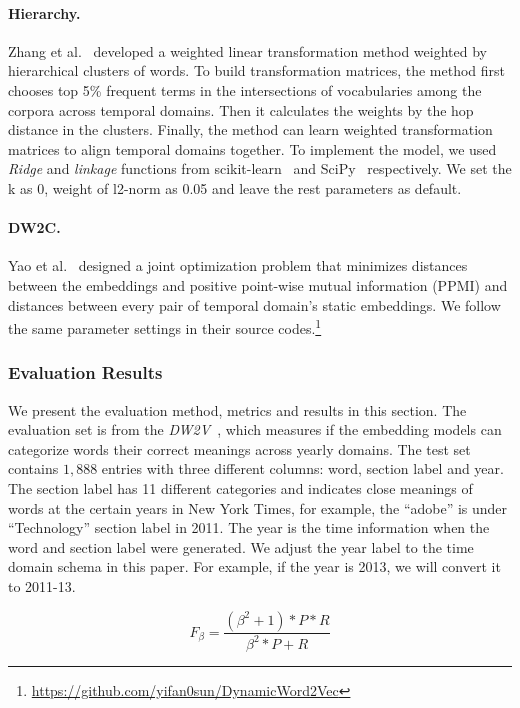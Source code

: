 \paragraph{Hierarchy.} Zhang et al.~\cite{zhang2017temporal} developed a weighted linear transformation method weighted by hierarchical clusters of words. To build transformation matrices, the method first chooses top 5\% frequent terms in the intersections of vocabularies among the corpora across temporal domains. Then it calculates the weights by the hop distance in the clusters. Finally, the method can learn weighted transformation matrices to align temporal domains together. To implement the model, we used \textit{Ridge} and \textit{linkage} functions from scikit-learn~\cite{pedregosa2011scikit} and SciPy~\cite{scipy_2001} respectively. We set the k as 0, weight of l2-norm as 0.05 and leave the rest parameters as default.

\paragraph{DW2C.} Yao et al.~\cite{yao2018dynamic} designed a joint optimization problem that minimizes distances between the embeddings and positive point-wise mutual information (PPMI) and distances between every pair of temporal domain's static embeddings. We follow the same parameter settings in their source codes.\footnote{\url{https://github.com/yifan0sun/DynamicWord2Vec}}

\subsubsection{Evaluation Results}
We present the evaluation method, metrics and results in this section.
The evaluation set is from the \textit{DW2V}~\cite{yao2018dynamic}, which measures if the embedding models can categorize words their correct meanings across yearly domains. 
The test set contains $1,888$ entries with three different columns: word, section label and year.
The section label has 11 different categories and indicates close meanings of words at the certain years in New York Times, for example, the ``adobe'' is under ``Technology'' section label in 2011.
The year is the time information when the word and section label were generated.
We adjust the year label to the time domain schema in this paper.
For example, if the year is 2013, we will convert it to 2011-13.

$$F_\beta = \frac{(\beta^2 + 1) * P * R}{\beta^2*P + R}$$

